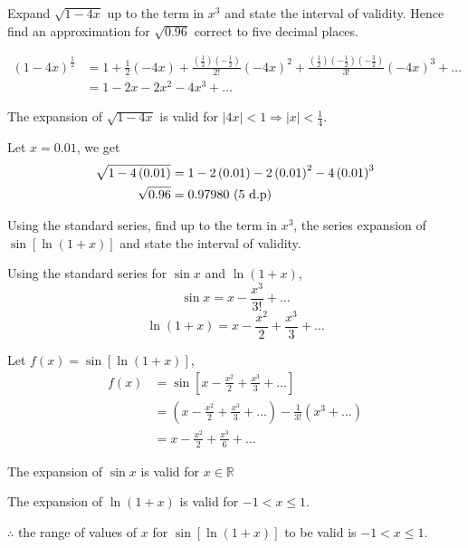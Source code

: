 \documentclass[11pt,a4paper]{book}
\newcommand{\R}{\mathbb{R}}
\begin{document}
\newpage

\begin{example}

Expand $\sqrt{1-4x}$ up to the term in $x^{3}$ and state the interval
of validity. Hence find an approximation for $\sqrt{0.96}$ correct
to five decimal places.

\Solution

\begin{align*}
\left(1-4x\right)^{\frac{1}{2}} & =1+\frac{1}{2}\left(-4x\right)+\frac{\left(\frac{1}{2}\right)\left(-\frac{1}{2}\right)}{2!}\left(-4x\right)^{2}+\frac{\left(\frac{1}{2}\right)\left(-\frac{1}{2}\right)\left(-\frac{3}{2}\right)}{3!}\left(-4x\right)^{3}+\ldots\\
 & =1-2x-2x^{2}-4x^{3}+\ldots
\end{align*}

The expansion of $\sqrt{1-4x}$ is valid for ${\displaystyle \left|4x\right|<1\Rightarrow\left|x\right|<\frac{1}{4}}$.

Let $x=0.01$, we get
\begin{align*}
\sqrt{1-4\left(0.01\right)} & =1-2\left(0.01\right)-2\left(0.01\right)^{2}-4\left(0.01\right)^{3}\\
\sqrt{0.96} & =0.97980\text{\text{ (5 d.p)}}
\end{align*}

\end{example}

\begin{example}

Using the standard series, find up to the term in $x^{3}$, the series
expansion of $\sin\left[\ln\left(1+x\right)\right]$ and state the
interval of validity.

\Solution

Using the standard series for $\sin x$ and $\ln\left(1+x\right)$,
\[
\sin x=x-\frac{x^{3}}{3!}+\ldots
\]
\[
\ln\left(1+x\right)=x-\frac{x^{2}}{2}+\frac{x^{3}}{3}+\ldots
\]

Let $f\left(x\right)=\sin\left[\ln\left(1+x\right)\right]$,
\begin{align*}
f\left(x\right) & =\sin\left[x-\frac{x^{2}}{2}+\frac{x^{3}}{3}+\ldots\right]\\
 & =\left(x-\frac{x^{2}}{2}+\frac{x^{3}}{3}+\ldots\right)-\frac{1}{3!}\left(x^{3}+\ldots\right)\\
 & =x-\frac{x^{2}}{2}+\frac{x^{3}}{6}+\ldots
\end{align*}

The expansion of $\sin x$ is valid for $x\in\R$

The expansion of $\ln\left(1+x\right)$ is valid for $-1<x\leq1$.

$\therefore$ the range of values of $x$ for $\sin\left[\ln\left(1+x\right)\right]$ to be valid is $-1<x\leq1$.

\end{example}
\end{document}
